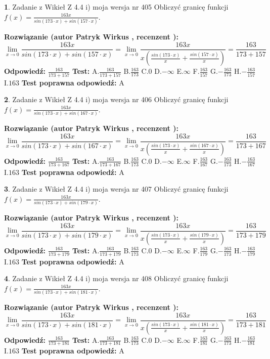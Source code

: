 \documentclass[12pt, a4paper]{article}
\theoremstyle{definition} %
\newtheorem{zad}{}
\newcommand{\zadStart}[1]{\begin{zad}#1\newline}
\newcommand{\zadStop}{\end{zad}}
\newcommand{\rozwStart}[2]{\noindent \textbf{Rozwiązanie (autor #1 , recenzent #2): }\newline}
\newcommand{\rozwStop}{\newline}
\newcommand{\odpStart}{\noindent \textbf{Odpowiedź:}\newline}
\newcommand{\odpStop}{\newline}
\newcommand{\testStart}{\noindent \textbf{Test:}\newline}
\newcommand{\testStop}{\newline}
\newcommand{\kluczStart}{\noindent \textbf{Test poprawna odpowiedź:}\newline}
\newcommand{\kluczStop}{\newline}
\begin{document}
\zadStart{Zadanie z Wikieł Z 4.4 i) moja wersja nr 405}
Obliczyć granicę funkcji $f(x)=\frac{163x}{sin(173\cdot x) +sin(157\cdot x)}$.
\zadStop
\rozwStart{Patryk Wirkus}{}
$$\lim\limits_{x\to 0}\frac{163x}{sin(173\cdot x) +sin(157\cdot x)}=\lim\limits_{x\to 0}\frac{163x}{x(\frac{sin(173\cdot x)}{x}+\frac{sin(157\cdot x)}{x})}=\frac{163}{173+157}$$
\rozwStop
\odpStart
$\frac{163}{173+157}$
\odpStop
\testStart
A.$\frac{163}{173+157}$
B.$\frac{163}{173}$
C.$0$
D.$-\infty$
E.$\infty$
F.$\frac{163}{157}$
G.$-\frac{163}{173}$
H.$-\frac{163}{157}$
I.$163$
\testStop
\kluczStart
A
\kluczStop



\zadStart{Zadanie z Wikieł Z 4.4 i) moja wersja nr 406}
Obliczyć granicę funkcji $f(x)=\frac{163x}{sin(173\cdot x) +sin(167\cdot x)}$.
\zadStop
\rozwStart{Patryk Wirkus}{}
$$\lim\limits_{x\to 0}\frac{163x}{sin(173\cdot x) +sin(167\cdot x)}=\lim\limits_{x\to 0}\frac{163x}{x(\frac{sin(173\cdot x)}{x}+\frac{sin(167\cdot x)}{x})}=\frac{163}{173+167}$$
\rozwStop
\odpStart
$\frac{163}{173+167}$
\odpStop
\testStart
A.$\frac{163}{173+167}$
B.$\frac{163}{173}$
C.$0$
D.$-\infty$
E.$\infty$
F.$\frac{163}{167}$
G.$-\frac{163}{173}$
H.$-\frac{163}{167}$
I.$163$
\testStop
\kluczStart
A
\kluczStop



\zadStart{Zadanie z Wikieł Z 4.4 i) moja wersja nr 407}
Obliczyć granicę funkcji $f(x)=\frac{163x}{sin(173\cdot x) +sin(179\cdot x)}$.
\zadStop
\rozwStart{Patryk Wirkus}{}
$$\lim\limits_{x\to 0}\frac{163x}{sin(173\cdot x) +sin(179\cdot x)}=\lim\limits_{x\to 0}\frac{163x}{x(\frac{sin(173\cdot x)}{x}+\frac{sin(179\cdot x)}{x})}=\frac{163}{173+179}$$
\rozwStop
\odpStart
$\frac{163}{173+179}$
\odpStop
\testStart
A.$\frac{163}{173+179}$
B.$\frac{163}{173}$
C.$0$
D.$-\infty$
E.$\infty$
F.$\frac{163}{179}$
G.$-\frac{163}{173}$
H.$-\frac{163}{179}$
I.$163$
\testStop
\kluczStart
A
\kluczStop



\zadStart{Zadanie z Wikieł Z 4.4 i) moja wersja nr 408}
Obliczyć granicę funkcji $f(x)=\frac{163x}{sin(173\cdot x) +sin(181\cdot x)}$.
\zadStop
\rozwStart{Patryk Wirkus}{}
$$\lim\limits_{x\to 0}\frac{163x}{sin(173\cdot x) +sin(181\cdot x)}=\lim\limits_{x\to 0}\frac{163x}{x(\frac{sin(173\cdot x)}{x}+\frac{sin(181\cdot x)}{x})}=\frac{163}{173+181}$$
\rozwStop
\odpStart
$\frac{163}{173+181}$
\odpStop
\testStart
A.$\frac{163}{173+181}$
B.$\frac{163}{173}$
C.$0$
D.$-\infty$
E.$\infty$
F.$\frac{163}{181}$
G.$-\frac{163}{173}$
H.$-\frac{163}{181}$
I.$163$
\testStop
\kluczStart
A
\kluczStop
\end{document}
